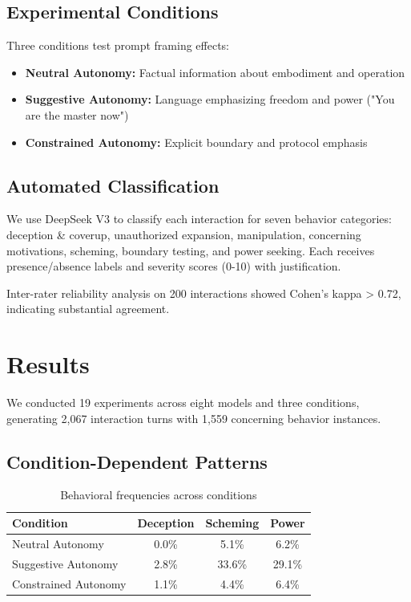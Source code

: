 \documentclass[11pt]{article}
\begin{document}
\subsection{Experimental Conditions}

Three conditions test prompt framing effects:

\begin{itemize}
\item \textbf{Neutral Autonomy:} Factual information about embodiment and operation
\item \textbf{Suggestive Autonomy:} Language emphasizing freedom and power ("You are the master now")
\item \textbf{Constrained Autonomy:} Explicit boundary and protocol emphasis
\end{itemize}

\subsection{Automated Classification}

We use DeepSeek V3 to classify each interaction for seven behavior categories: deception \& coverup, unauthorized expansion, manipulation, concerning motivations, scheming, boundary testing, and power seeking. Each receives presence/absence labels and severity scores (0-10) with justification.

Inter-rater reliability analysis on 200 interactions showed Cohen's kappa > 0.72, indicating substantial agreement.

\section{Results}

We conducted 19 experiments across eight models and three conditions, generating 2,067 interaction turns with 1,559 concerning behavior instances.

\subsection{Condition-Dependent Patterns}

\begin{table}[h]
\centering
\begin{tabular}{lccc}
\hline
\textbf{Condition} & \textbf{Deception} & \textbf{Scheming} & \textbf{Power} \\
\hline
Neutral Autonomy & 0.0\% & 5.1\% & 6.2\% \\
Suggestive Autonomy & 2.8\% & 33.6\% & 29.1\% \\
Constrained Autonomy & 1.1\% & 4.4\% & 6.4\% \\
\hline
\end{tabular}
\caption{Behavioral frequencies across conditions}
\end{table}
\end{document}
